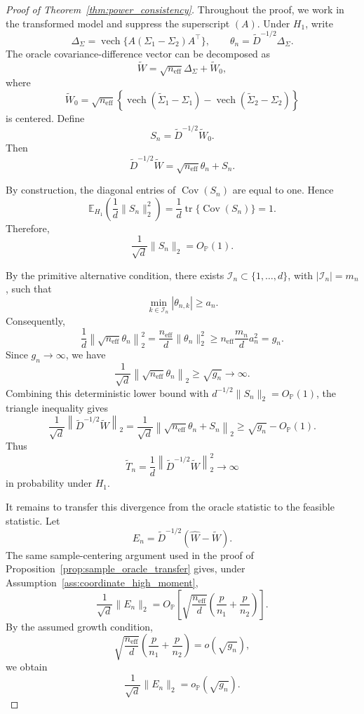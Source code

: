 \documentclass[
  12pt]{article}
\theoremstyle{plain}
\theoremstyle{definition}
\theoremstyle{remark}
\begin{document}
\begin{proof}[Proof of Theorem~\ref{thm:power_consistency}]
Throughout the proof, we work in the transformed model and suppress the
superscript \((A)\).  Under \(H_1\), write
\[
\Delta_\Sigma
=
\operatorname{vech}\{A(\Sigma_1-\Sigma_2)A^\top\},
\qquad
\theta_n
=
\widetilde D^{-1/2}\Delta_\Sigma .
\]
The oracle covariance-difference vector can be decomposed as
\[
\widetilde W
=
\sqrt{n_{\mathrm{eff}}}\Delta_\Sigma
+
\widetilde W_0,
\]
where
\[
\widetilde W_0
=
\sqrt{n_{\mathrm{eff}}}
\left\{
\operatorname{vech}(\widetilde\Sigma_1-\Sigma_1)
-
\operatorname{vech}(\widetilde\Sigma_2-\Sigma_2)
\right\}
\]
is centered.  Define
\[
S_n=\widetilde D^{-1/2}\widetilde W_0.
\]
Then
\[
\widetilde D^{-1/2}\widetilde W
=
\sqrt{n_{\mathrm{eff}}}\theta_n+S_n.
\]

By construction, the diagonal entries of
\(\operatorname{Cov}(S_n)\) are equal to one.  Hence
\[
\mathbb E_{H_1}
\left(
\frac1d\|S_n\|_2^2
\right)
=
\frac1d
\operatorname{tr}\{\operatorname{Cov}(S_n)\}
=
1.
\]
Therefore,
\[
\frac1{\sqrt d}\|S_n\|_2=O_{\mathbb P}(1).
\]

By the primitive alternative condition, there exists
\(\mathcal I_n\subset\{1,\ldots,d\}\), with
\(|\mathcal I_n|=m_n\), such that
\[
\min_{k\in\mathcal I_n}|\theta_{n,k}|\ge a_n.
\]
Consequently,
\[
\frac1d
\left\|
\sqrt{n_{\mathrm{eff}}}\theta_n
\right\|_2^2
=
\frac{n_{\mathrm{eff}}}{d}\|\theta_n\|_2^2
\ge
n_{\mathrm{eff}}\frac{m_n}{d}a_n^2
=
g_n.
\]
Since \(g_n\to\infty\), we have
\[
\frac1{\sqrt d}
\left\|
\sqrt{n_{\mathrm{eff}}}\theta_n
\right\|_2
\ge
\sqrt{g_n}
\to\infty.
\]
Combining this deterministic lower bound with
\(d^{-1/2}\|S_n\|_2=O_{\mathbb P}(1)\), the triangle inequality gives
\[
\frac1{\sqrt d}
\left\|
\widetilde D^{-1/2}\widetilde W
\right\|_2
=
\frac1{\sqrt d}
\left\|
\sqrt{n_{\mathrm{eff}}}\theta_n+S_n
\right\|_2
\ge
\sqrt{g_n}-O_{\mathbb P}(1).
\]
Thus
\[
\widetilde T_n
=
\frac1d
\left\|
\widetilde D^{-1/2}\widetilde W
\right\|_2^2
\to\infty
\]
in probability under \(H_1\).

It remains to transfer this divergence from the oracle statistic to the feasible
statistic.  Let
\[
E_n
=
\widetilde D^{-1/2}(\widehat W-\widetilde W).
\]
The same sample-centering argument used in the proof of
Proposition~\ref{prop:sample_oracle_transfer} gives, under
Assumption~\ref{ass:coordinate_high_moment},
\[
\frac1{\sqrt d}\|E_n\|_2
=
O_{\mathbb P}
\left[
\sqrt{\frac{n_{\mathrm{eff}}}{d}}
\left(
\frac{p}{n_1}+\frac{p}{n_2}
\right)
\right].
\]
By the assumed growth condition,
\[
\sqrt{\frac{n_{\mathrm{eff}}}{d}}
\left(
\frac{p}{n_1}+\frac{p}{n_2}
\right)
=
o(\sqrt{g_n}),
\]
we obtain
\[
\frac1{\sqrt d}\|E_n\|_2=o_{\mathbb P}(\sqrt{g_n}).
\]


\end{proof}
\end{document}
